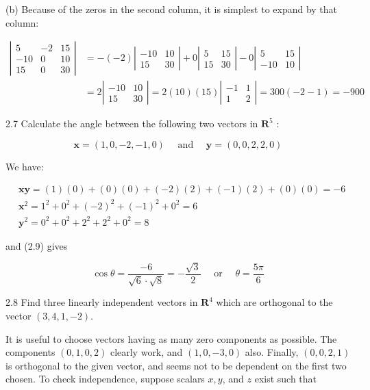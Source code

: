 \documentclass[10pt]{article}
\begin{document}
(b) Because of the zeros in the second column, it is simplest to expand by that column:

$$
\begin{aligned}
\left|\begin{array}{rrr}
5 & -2 & 15 \\
-10 & 0 & 10 \\
15 & 0 & 30
\end{array}\right| & =-(-2)\left|\begin{array}{rr}
-10 & 10 \\
15 & 30
\end{array}\right|+0\left|\begin{array}{rr}
5 & 15 \\
15 & 30
\end{array}\right|-0\left|\begin{array}{rr}
5 & 15 \\
-10 & 10
\end{array}\right| \\
& =2\left|\begin{array}{rr}
-10 & 10 \\
15 & 30
\end{array}\right|=2(10)(15)\left|\begin{array}{rr}
-1 & 1 \\
1 & 2
\end{array}\right|=300(-2-1)=-900
\end{aligned}
$$

2.7 Calculate the angle between the following two vectors in $\mathbf{R}^{5}$ :

$$
\mathbf{x}=(1,0,-2,-1,0) \quad \text { and } \quad \mathbf{y}=(0,0,2,2,0)
$$

We have:

$$
\begin{aligned}
& \mathbf{x y}=(1)(0)+(0)(0)+(-2)(2)+(-1)(2)+(0)(0)=-6 \\
& \mathbf{x}^{2}=1^{2}+0^{2}+(-2)^{2}+(-1)^{2}+0^{2}=6 \\
& \mathbf{y}^{2}=0^{2}+0^{2}+2^{2}+2^{2}+0^{2}=8
\end{aligned}
$$

and (2.9) gives

$$
\cos \theta=\frac{-6}{\sqrt{6} \cdot \sqrt{8}}=-\frac{\sqrt{3}}{2} \quad \text { or } \quad \theta=\frac{5 \pi}{6}
$$

2.8 Find three linearly independent vectors in $\mathbf{R}^{4}$ which are orthogonal to the vector $(3,4,1,-2)$.

It is useful to choose vectors having as many zero components as possible. The components $(0,1,0,2)$ clearly work, and $(1,0,-3,0)$ also. Finally, $(0,0,2,1)$ is orthogonal to the given vector, and seems not to be dependent on the first two chosen. To check independence, suppose scalars $x, y$, and $z$ exist such that
\end{document}
